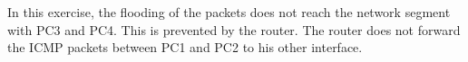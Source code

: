 In this exercise, the flooding of the packets does not reach the network segment with PC3 and PC4. This is prevented by the router. The router does not forward the ICMP packets between PC1 and PC2 to his other interface.
